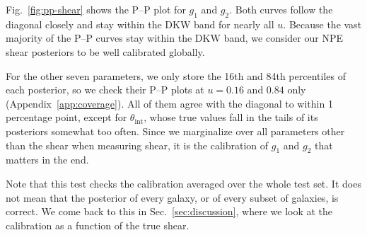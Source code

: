 Fig.~\ref{fig:pp-shear} shows the P--P plot for $g_1$ and $g_2$. Both curves follow the diagonal closely and stay within the DKW band for nearly all $u$. Because the vast majority of the P--P curves stay within the DKW band, we consider our NPE shear posteriors to be well calibrated globally.

For the other seven parameters, we only store the 16th and 84th percentiles of each posterior, so we check their P--P plots at $u = 0.16$ and $0.84$ only (Appendix~\ref{app:coverage}). All of them agree with the diagonal to within 1 percentage point, except for $\theta_\mathrm{int}$, whose true values fall in the tails of its posteriors somewhat too often. Since we marginalize over all parameters other than the shear when measuring shear, it is the calibration of $g_1$ and $g_2$ that matters in the end.

Note that this test checks the calibration averaged over the whole test set. It does not mean that the posterior of every galaxy, or of every subset of galaxies, is correct. We come back to this in Sec.~\ref{sec:discussion}, where we look at the calibration as a function of the true shear.
